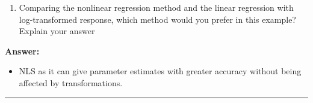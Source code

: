 \documentclass[
]{article}
\providecommand{\tightlist}{%
  \setlength{\itemsep}{0pt}\setlength{\parskip}{0pt}}
\begin{document}
\begin{enumerate}
\def\labelenumi{\arabic{enumi}.}
\setcounter{enumi}{9}
\tightlist
\item
  Comparing the nonlinear regression method and the linear regression
  with log-transformed response, which method would you prefer in this
  example? Explain your answer
\end{enumerate}

\textbf{Answer:}

\begin{itemize}
\tightlist
\item
  NLS as it can give parameter estimates with greater accuracy without
  being affected by transformations.
\end{itemize}

\begin{center}\rule{0.5\linewidth}{0.5pt}\end{center}
\end{document}
